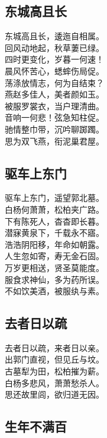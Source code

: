 \documentclass[]{article}
\begin{document}
\hypertarget{header-n50}{%
\subsection{东城高且长}\label{header-n50}}

东城高且长，逶迤自相属。\\
回风动地起，秋草萋已绿。\\
四时更变化，岁暮一何速！\\
晨风怀苦心，蟋蟀伤局促。\\
荡涤放情志，何为自结束？\\
燕赵多佳人，美者颜如玉。\\
被服罗裳衣，当户理清曲。\\
音响一何悲！弦急知柱促。\\
驰情整巾带，沉吟聊踯躅。\\
思为双飞燕，衔泥巢君屋。

\hypertarget{header-n54}{%
\subsection{驱车上东门}\label{header-n54}}

驱车上东门，遥望郭北墓。\\
白杨何萧萧，松柏夹广路。\\
下有陈死人，杳杳即长暮。\\
潜寐黄泉下，千载永不寤。\\
浩浩阴阳移，年命如朝露。\\
人生忽如寄，寿无金石固。\\
万岁更相送，贤圣莫能度。\\
服食求神仙，多为药所误。\\
不如饮美酒，被服纨与素。

\hypertarget{header-n58}{%
\subsection{去者日以疏}\label{header-n58}}

去者日以疏，来者日以亲。\\
出郭门直视，但见丘与坟。\\
古墓犁为田，松柏摧为薪。\\
白杨多悲风，萧萧愁杀人。\\
思还故里闾，欲归道无因。

\hypertarget{header-n62}{%
\subsection{生年不满百}\label{header-n62}}
\end{document}
